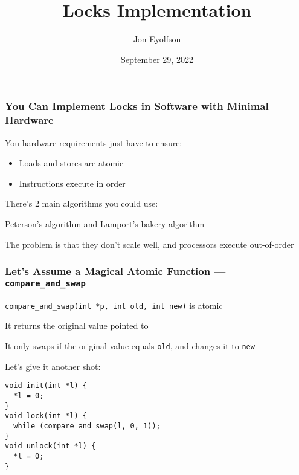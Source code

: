 

\title{Locks Implementation}
\author{Jon Eyolfson}
\date{September 29, 2022}


  \begin{frame}
    \titlepage
  \end{frame}

  \begin{frame}
    \frametitle{You Can Implement Locks in Software with Minimal Hardware}

    You hardware requirements just have to ensure:
    \begin{itemize}
      \item Loads and stores are atomic
      \item Instructions execute in order
    \end{itemize}

    \vspace{2em}

    There's 2 main algorithms you could use:

    \hspace{2em}
    \href{https://en.wikipedia.org/wiki/Peterson\%27s_algorithm}
    {Peterson's algorithm}
    and
    \href{http://en.wikipedia.org/wiki/Lamport\%27s_bakery_algorithm}
         {Lamport's bakery algorithm}

    \vspace{2em}

    The problem is that they don't scale well, and processors execute
    out-of-order
  \end{frame}

  \begin{frame}[fragile]
    \frametitle{Let's Assume a Magical Atomic Function ---
                \texttt{compare\_and\_swap}}

    \texttt{compare\_and\_swap(int *p, int old, int new)} is atomic

    \hspace{2em} It returns the original value pointed to

    \hspace{2em} It only swaps if the original value equals \texttt{old}, and changes it to \texttt{new}

    \vspace{2em}

    Let's give it another shot:

    \begin{lstlisting}
void init(int *l) {
  *l = 0;
}
void lock(int *l) {
  while (compare_and_swap(l, 0, 1));
}
void unlock(int *l) {
  *l = 0;
}   
    \end{lstlisting}
  \end{frame}

